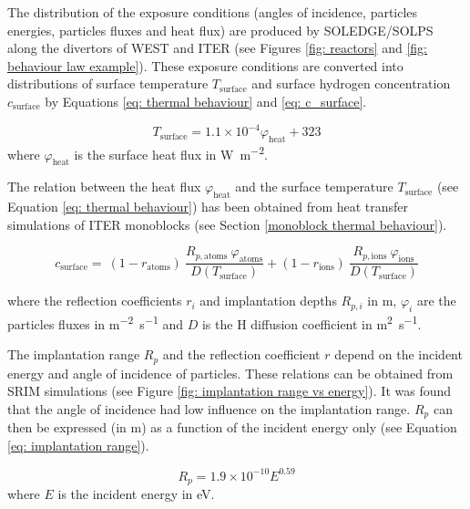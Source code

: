 The distribution of the exposure conditions (angles of incidence, particles energies, particles fluxes and heat flux) are produced by SOLEDGE/SOLPS along the divertors of WEST and ITER (see Figures \ref{fig: reactors} and \ref{fig: behaviour law example}).
These exposure conditions are converted into distributions of surface temperature $T_\mathrm{surface}$ and surface hydrogen concentration $c_\mathrm{surface}$ by Equations \eqref{eq: thermal behaviour} and \eqref{eq: c_surface}.

\begin{equation}
    T_\mathrm{surface} = 1.1\times 10^{-4} \varphi_\mathrm{heat} + 323
    \label{eq: thermal behaviour}
\end{equation}
where $\varphi_\mathrm{heat}$ is the surface heat flux in \si{W.m^{-2}}.

The relation between the heat flux $\varphi_\mathrm{heat}$ and the surface temperature $T_\mathrm{surface}$ (see Equation \eqref{eq: thermal behaviour}) has been obtained from heat transfer simulations of ITER monoblocks (see Section \ref{monoblock thermal behaviour}).

\begin{equation}
    \label{eq: c_surface}
    c_\mathrm{surface} = \ (1 - r_\mathrm{atoms}) \ \frac{R_{p, \mathrm{atoms}} \ \varphi_\mathrm{atoms}}{D(T_\mathrm{surface})} + (1 - r_\mathrm{ions}) \nonumber \ \frac{R_{p, \mathrm{ions}} \ \varphi_\mathrm{ions}}{D(T_\mathrm{surface})}
\end{equation}

where the reflection coefficients $r_i$ and implantation depths $R_{p, i}$ in \si{m}, $\varphi_{i}$ are the particles fluxes in \si{m^{-2}.s^{-1}} and $D$ is the H diffusion coefficient in \si{m^{2}.s^{-1}}.

The implantation range $R_p$ and the reflection coefficient $r$ depend on the incident energy and angle of incidence of particles.
These relations can be obtained from SRIM  simulations (see Figure \ref{fig: implantation range vs energy}).
It was found that the angle of incidence had low influence on the implantation range.
$R_p$ can then be expressed (in \si{m}) as a function of the incident energy only (see Equation \eqref{eq: implantation range}).

\begin{equation}
    R_p = 1.9\times 10^{-10} E ^{0.59}
    \label{eq: implantation range}
\end{equation}
where $E$ is the incident energy in \si{eV}.

